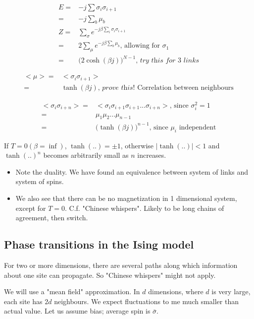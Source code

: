 \documentclass[]{article}
\begin{document}
\begin{align*}
E =& -j \sum \sigma_i \sigma_{i+1}\\
=& -j \sum_{b} \mu_b\\
Z =& \sum_{\sigma} e^{- j \beta\sum_i  \sigma_i \sigma_{i+1}}\\
=& 2 \sum_{\mu} e^{- j \beta  \sum_b \mu_b} \text{, allowing for $\sigma_1$}\\
=& \big(2 \cosh(\beta j)\big)^{N-1}\textit{, try this for 3 links}
\end{align*}

\begin{align*}
\big< \mu \big> =& \big< \sigma_i \sigma_{i+1} \big>\\
=& \tanh(\beta j) \textit{, prove this!}\text{ Correlation between neighbours}
\end{align*}

\begin{align*}
\big < \sigma_i \sigma_{i+n} \big> =&  \big < \sigma_i \sigma_{i+1} \sigma_{i+1}... \sigma_{i+n} \big>\text{, since $\sigma_i^2 = 1$}\\
=& \mu_1 \mu_2 ... \mu_{n-1}\\
=& \big( \tanh(\beta j)\big)^{n-1}\text{, since $\mu_i$ independent}
\end{align*}

If $T=0(\beta=\inf)$, $\tanh(..)=\pm1$, otherwise $\lvert \tanh(..) \rvert<1$ and $\tanh(..)^n$ becomes arbitrarily small as $n$ increases.

\begin{itemize}
	\item Note the duality. We have found an equivalence between system of links and system of spins. 
	\item We also see that there can be no magnetization in 1 dimensional system, except for $T=0$. C.f. "Chinese whispers". Likely to be long chains of agreement, then switch.
\end{itemize}
 
\subsection{Phase transitions in the Ising model}

For two or more dimensions, there are several paths along which information about one site can propagate. So "Chinese whispers" might not apply.

We will use a "mean field" approximation. In $d$ dimensions, where $d$ is very large, each site has $2d$ neighbours. We expect fluctuations to me much smaller than actual value. Let us assume bias; average spin is $\bar{\sigma}$.
\end{document}
